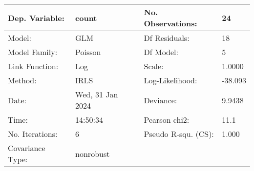 \begin{tabular}{llll}
\toprule
Dep. Variable: & count &   No. Observations:   &     24 \\
\midrule
Model: & GLM &   Df Residuals:       &     18 \\
Model Family: & Poisson &   Df Model:           &      5 \\
Link Function: & Log &   Scale:              &   1.0000 \\
Method: & IRLS &   Log-Likelihood:     &  -38.093 \\
Date: & Wed, 31 Jan 2024 &   Deviance:           &   9.9438 \\
Time: & 14:50:34 &   Pearson chi2:       &   11.1 \\
No. Iterations: & 6 &   Pseudo R-squ. (CS): &  1.000 \\
Covariance Type: & nonrobust &                       &   \\
\bottomrule
\end{tabular}
